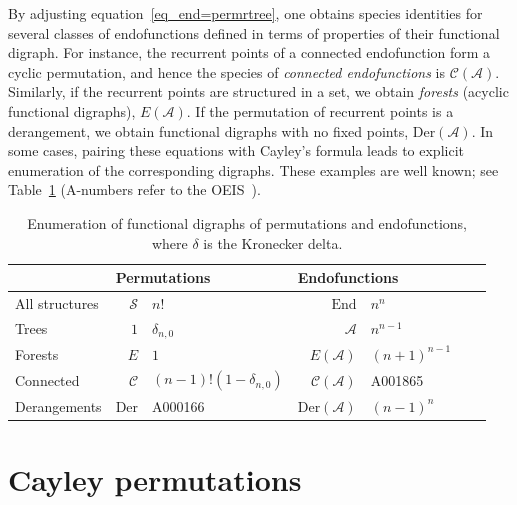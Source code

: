 \documentclass[a4paper,11pt,UKenglish]{article}
\newcommand{\Set}{E}
\newcommand{\Sym}{\mathcal{S}}
\newcommand{\End}{\mathrm{End}}
\newcommand{\Cyc}{\mathcal{C}}
\newcommand{\Der}{\mathrm{Der}}
\newcommand{\rtree}{\mathcal{A}}
\theoremstyle{definition}
\begin{document}
By adjusting equation~\eqref{eq_end=permrtree}, one obtains species
identities for several classes of endofunctions defined in
terms of properties of their functional digraph.
For instance, the recurrent points of a connected endofunction form
a cyclic permutation, and hence the species of \emph{connected
endofunctions} is $\Cyc(\rtree)$. Similarly, if the recurrent points
are structured in a set, we obtain \emph{forests} (acyclic functional
digraphs), $\Set(\rtree)$. If the permutation of recurrent points
is a derangement, we obtain functional digraphs with no fixed points,
$\Der(\rtree)$. In some cases, pairing these equations with Cayley's
formula leads to explicit enumeration of the corresponding digraphs.
These examples are well known; see Table~\ref{table_oeis}
(A-numbers refer to the OEIS~\cite{Sl}).

\begin{table}
\begin{center}
\renewcommand{\arraystretch}{1.25}
\begin{tabular}{p{3cm}rlrlrl}
  & \multicolumn{2}{l}{Permutations} & \multicolumn{2}{l}{Endofunctions} \\
  \toprule
  All structures & $\Sym$ & $n!$                     & $\End$         & $n^n$ \\
  Trees          & $1$    & $\delta_{n,0}$           & $\rtree$       & $n^{n-1}$ \\
  Forests        & $\Set$ & $1$                      & $\Set(\rtree)$ & $(n+1)^{n-1}$ \\
  Connected      & $\Cyc$ & $(n-1)!(1-\delta_{n,0})$ & $\Cyc(\rtree)$ & A001865 \\
  Derangements   & $\Der$ & A000166                  & $\Der(\rtree)$ & $(n-1)^n$
\end{tabular}
\end{center}
\caption{Enumeration of functional digraphs of permutations and
endofunctions, where $\delta$ is the Kronecker delta.
}\label{table_oeis}
\end{table}

\section{Cayley permutations}\label{section_cayperms}
\end{document}
